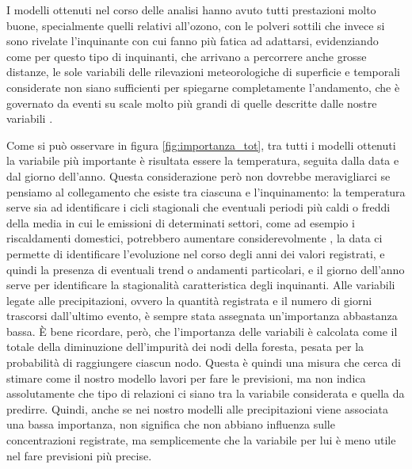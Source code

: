 I modelli ottenuti nel corso delle analisi hanno avuto tutti prestazioni molto buone, specialmente quelli relativi all'ozono, con le polveri sottili che invece si sono rivelate l'inquinante con cui fanno più fatica ad adattarsi, evidenziando come per questo tipo di inquinanti, che arrivano a percorrere anche grosse distanze, le sole variabili delle rilevazioni meteorologiche di superficie e temporali considerate non siano sufficienti per spiegarne completamente l'andamento, che è governato da eventi su scale molto più grandi di quelle descritte dalle nostre variabili \cite{grange2018random}. 

Come si può osservare in figura \ref{fig:importanza_tot}, tra tutti i modelli ottenuti la variabile più importante è risultata essere la temperatura, seguita dalla data e dal giorno dell'anno. Questa considerazione però non dovrebbe meravigliarci se pensiamo al collegamento che esiste tra ciascuna e l'inquinamento: la temperatura serve sia ad identificare i cicli stagionali che eventuali periodi più caldi o freddi della media in cui le emissioni di determinati settori, come ad esempio i riscaldamenti domestici, potrebbero aumentare considerevolmente
, la data ci permette di identificare l'evoluzione nel corso degli anni dei valori registrati, e quindi la presenza di eventuali trend o andamenti particolari, e il giorno dell'anno serve per identificare la stagionalità caratteristica degli inquinanti.  
Alle variabili legate alle precipitazioni, ovvero la quantità registrata e il numero di giorni trascorsi dall'ultimo evento, è sempre stata assegnata un'importanza abbastanza bassa. È bene ricordare, però, che l'importanza delle variabili è calcolata come il totale della diminuzione dell'impurità dei nodi della foresta, pesata per la probabilità di raggiungere ciascun nodo. Questa è quindi una misura che cerca di stimare come il nostro modello lavori per fare le previsioni, ma non indica assolutamente che tipo di relazioni ci siano tra la variabile considerata e quella da predirre. Quindi, anche se nei nostro modelli alle precipitazioni viene associata una bassa importanza, non significa che non abbiano influenza sulle concentrazioni registrate, ma semplicemente che la variabile per lui è meno utile nel fare previsioni più precise. 

